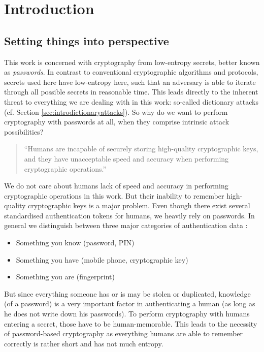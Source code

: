 
\chapter{Introduction}  %

\ifpdf
    \graphicspath{{Chapters/Figs/Raster/}{Chapters/Figs/PDF/}{Chapters/Figs/}}
\else
    \graphicspath{{Chapters/Figs/Vector/}{Chapters/Figs/}}
\fi

\section{Setting things into perspective}
This work is concerned with cryptography from low-entropy secrets, better known as \emph{passwords}.
In contrast to conventional cryptographic algorithms and protocols, secrets used here have low-entropy here, such that an adversary is able to iterate through all possible secrets in reasonable time.
This leads directly to the inherent threat to everything we are dealing with in this work: so-called dictionary attacks (cf. Section \ref{sec:introdictionaryattacks}).
So why do we want to perform cryptography with passwords at all, when they comprise intrinsic attack possibilities?

\begin{quote}
``Humans are incapable of securely storing high-quality cryptographic keys, and they have unacceptable speed and accuracy when performing cryptographic operations.''~\citeauthor{Kaufmann02} \cite{Kaufmann02}
\end{quote}

\noindent
We do not care about humans lack of speed and accuracy in performing cryptographic operations in this work.
But their inability to remember high-quality cryptographic keys is a major problem.
Even though there exist several standardised authentication tokens for humans, we heavily rely on passwords.
In general we distinguish between three major categories of authentication data \cite{Burr11}:
\begin{itemize}
	\item Something you know (\eg password, \ac{PIN})
	\item Something you have (\eg mobile phone, cryptographic key)
	\item Something you are (\eg fingerprint)
\end{itemize}
But since everything someone has or is may be stolen or duplicated, knowledge (of a password) is a very important factor in authenticating a human (as long as he does not write down his passwords).
To perform cryptography with humans entering a secret, those have to be human-memorable.
This leads to the necessity of password-based cryptography as everything humans are able to remember correctly is rather short and has not much entropy.

